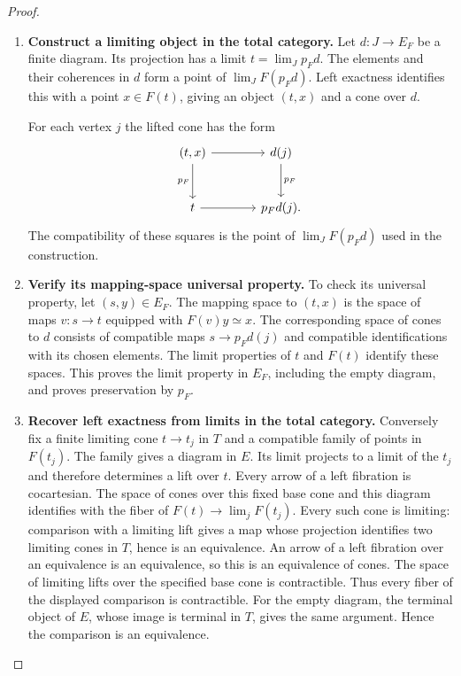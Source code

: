 \documentclass[oneside]{article}
\theoremstyle{plain}
\theoremstyle{definition}
\theoremstyle{remark}
\begin{document}
\begin{proof}
\leavevmode
\begin{enumerate}
\item \textbf{Construct a limiting object in the total category.} Let $d:J\to E_F$ be a finite diagram. Its projection has a limit $t=\lim_J p_Fd$. The elements and their coherences in $d$ form a point of $\lim_JF(p_Fd)$. Left exactness identifies this with a point $x\in F(t)$, giving an object $(t,x)$ and a cone over $d$.
\begin{samepage}
For each vertex $j$ the lifted cone has the form
\[
\begin{tikzcd}[column sep=large,row sep=large]
 (t,x)\ar[r]\ar[d,"p_F"']&d(j)\ar[d,"p_F"]\\
 t\ar[r]&p_Fd(j).
\end{tikzcd}
\]
The compatibility of these squares is the point of
$\lim_JF(p_Fd)$ used in the construction.
\end{samepage}
\item \textbf{Verify its mapping-space universal property.} To check its universal property, let $(s,y)\in E_F$. The mapping space to $(t,x)$ is the space of maps $v:s\to t$ equipped with $F(v)y\simeq x$. The corresponding space of cones to $d$ consists of compatible maps $s\to p_Fd(j)$ and compatible identifications with its chosen elements. The limit properties of $t$ and $F(t)$ identify these spaces. This proves the limit property in $E_F$, including the empty diagram, and proves preservation by $p_F$.
\item \textbf{Recover left exactness from limits in the total category.} Conversely fix a finite limiting cone $t\to t_j$ in $T$ and a compatible family of points in $F(t_j)$. The family gives a diagram in $E$. Its limit projects to a limit of the $t_j$ and therefore determines a lift over $t$. Every arrow of a left fibration is cocartesian. The space of cones over this fixed base cone and this diagram identifies with the fiber of $F(t)\longrightarrow\lim_jF(t_j).$ Every such cone is limiting: comparison with a limiting lift gives a map whose projection identifies two limiting cones in $T$, hence is an equivalence. An arrow of a left fibration over an equivalence is an equivalence, so this is an equivalence of cones. The space of limiting lifts over the specified base cone is contractible. Thus every fiber of the displayed comparison is contractible. For the empty diagram, the terminal object of $E$, whose image is terminal in $T$, gives the same argument. Hence the comparison is an equivalence.\qedhere
\end{enumerate}
\end{proof}
\end{document}
